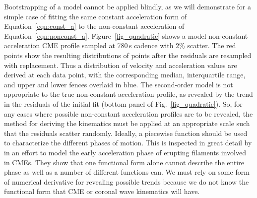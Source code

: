 \documentclass[structabstract]{aa}
\begin{document}
Bootstrapping of a model cannot be applied blindly, as we will demonstrate for a simple case of fitting the same constant acceleration form of Equation~\ref{eqn:const_a} to the non-constant acceleration of Equation~\ref{eqn:nonconst_a}. Figure~\ref{fig_quadratic} shows a model non-constant acceleration CME profile sampled at 780\,s cadence with 2\% scatter. The red points show the resulting distributions of points after the residuals are resampled with replacement. Thus a distribution of velocity and acceleration values are derived at each data point, with the corresponding median, interquartile range, and upper and lower fences overlaid in blue. The second-order model is not appropriate to the true non-constant acceleration profile, as revealed by the trend in the residuals of the initial fit (bottom panel of Fig.~\ref{fig_quadratic}). So, for any cases where possible non-constant acceleration profiles are to be revealed, the method for deriving the kinematics must be applied at an appropriate scale such that the residuals scatter randomly. Ideally, a piecewise function should be used to characterize the different phases of motion. This is inspected in great detail by \citet{2008ApJ...674..586S} in an effort to model the early acceleration phase of erupting filaments involved in CMEs. They show that one functional form alone cannot describe the entire phase as well as a number of different functions can. We must rely on some form of numerical derivative for revealing possible trends because we do not know the functional form that CME or coronal wave kinematics will have.
\end{document}
